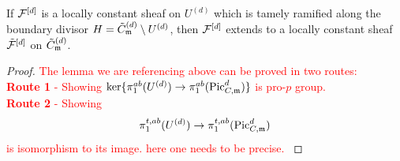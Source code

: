 \begin{lemma}\label{lemma:ExtensionOfTamelyRamifiedSheaf}
    If $\cF^{[d]}$ is a locally constant sheaf on $U^{(d)}$ which is tamely ramified along the boundary divisor $H = \tilde{C}^{(d)}_\mdls \setminus U^{(d)}$,
    then $\cF^{[d]}$ extends to a locally constant sheaf $\tilde{\cF}^{[d]}$ on $\tilde{C}^{(d)}_\mdls$.
\end{lemma}
\begin{proof}
    \textcolor{red}{The lemma we are referencing above can be proved in two routes:
\\
\textbf{Route 1} - Showing $ \ker \{\pi^{ab}_1(U^{(d)}) \to \pi^{ab}_1(\PicCm[d]) \} $ is pro-$p$ group. \\
\textbf{Route 2} - Showing $$\pi^{t, ab}_1(U^{(d)}) \to \pi^{t,ab}_1(\PicCm[d])$$ is isomorphism to its image.  \textcolor{red}{here one needs to be precise.}
}

\end{proof}
